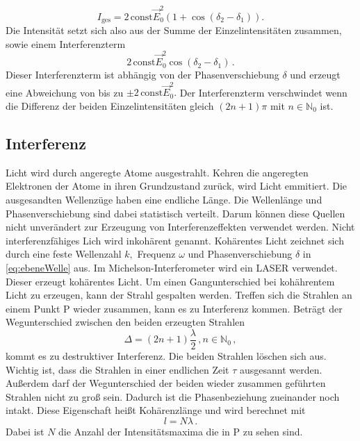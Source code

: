 \begin{equation}\label{eq:Intensitaet}
    I_{\text{ges}} = 2\,\text{const}\vec{E}_0^2\left(1 + \cos{(δ_2-δ_1)}\right).
\end{equation}
Die Intensität setzt sich also aus der Summe der Einzelintensitäten zusammen,
sowie einem Interferenzterm
\begin{equation*}
    2\,\text{const}\vec{E}_0^2\cos{(δ_2-δ_1)}\, .
\end{equation*}
Dieser Interferenzterm ist abhängig von der Phasenverschiebung $δ$ und erzeugt eine Abweichung von bis zu $\pm 2\,\text{const}\vec{E}_0^2.$ 
Der Interferenzterm verschwindet wenn die Differenz der beiden Einzelintensitäten gleich $(2n + 1)π$ mit $n \in \mathbb{N}_0$ ist.

\subsection{Interferenz}
\label{sec:Interferenz}

Licht wird durch angeregte Atome ausgestrahlt. 
Kehren die angeregten Elektronen der Atome in ihren Grundzustand zurück, wird Licht emmitiert.
Die ausgesandten Wellenzüge haben eine endliche Länge.
Die Wellenlänge und Phasenverschiebung sind dabei statistisch verteilt.
Darum können diese Quellen nicht unverändert zur Erzeugung von Interferenzeffekten verwendet werden.
Nicht interferenzfähiges Lich wird inkohärent genannt.
Kohärentes Licht zeichnet sich durch eine feste Wellenzahl $k,$ Frequenz $ω$ und Phasenverschiebung $δ$ in \autoref{eq:ebeneWelle} aus.
Im Michelson-Interferometer wird ein LASER verwendet.
Dieser erzeugt kohärentes Licht.
Um einen Gangunterschied bei kohährentem Licht zu erzeugen, kann der Strahl gespalten werden.
Treffen sich die Strahlen an einem Punkt P wieder zusammen, kann es zu Interferenz kommen.
Beträgt der Wegunterschied zwischen den beiden erzeugten Strahlen
\begin{equation*}
    Δ = \left(2n + 1\right)\frac{λ}{2}\, , n \in \mathbb{N}_0\, ,
\end{equation*}
kommt es zu destruktiver Interferenz. Die beiden Strahlen löschen sich aus.
Wichtig ist, dass die Strahlen in einer endlichen Zeit $τ$ ausgesannt werden.
Außerdem darf der Wegunterschied der beiden wieder zusammen geführten Strahlen nicht zu groß sein.
Dadurch ist die Phasenbeziehung zueinander noch intakt.
Diese Eigenschaft heißt Kohärenzlänge und wird berechnet mit
\begin{equation*}
    l = N λ\, .
\end{equation*}
Dabei ist $N$ die Anzahl der Intensitätsmaxima die in P zu sehen sind.
